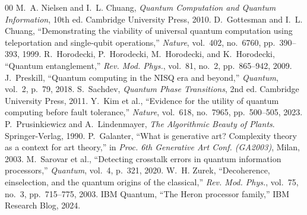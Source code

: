\documentclass[conference]{IEEEtran}
\begin{document}
\begin{thebibliography}{00}
 M.~A. Nielsen and I.~L. Chuang, \emph{Quantum Computation and Quantum Information}, 10th ed. Cambridge University Press, 2010.
 D.~Gottesman and I.~L. Chuang, ``Demonstrating the viability of universal quantum computation using teleportation and single-qubit operations,'' \emph{Nature}, vol.~402, no.~6760, pp.~390--393, 1999.
 R.~Horodecki, P.~Horodecki, M.~Horodecki, and K.~Horodecki, ``Quantum entanglement,'' \emph{Rev. Mod. Phys.}, vol.~81, no.~2, pp.~865--942, 2009.
 J.~Preskill, ``Quantum computing in the NISQ era and beyond,'' \emph{Quantum}, vol.~2, p.~79, 2018.
 S.~Sachdev, \emph{Quantum Phase Transitions}, 2nd ed. Cambridge University Press, 2011.
 Y.~Kim et al., ``Evidence for the utility of quantum computing before fault tolerance,'' \emph{Nature}, vol.~618, no.~7965, pp.~500--505, 2023.
 P.~Prusinkiewicz and A.~Lindenmayer, \emph{The Algorithmic Beauty of Plants}. Springer-Verlag, 1990.
 P.~Galanter, ``What is generative art? Complexity theory as a context for art theory,'' in \emph{Proc. 6th Generative Art Conf. (GA2003)}, Milan, 2003.
 M.~Sarovar et al., ``Detecting crosstalk errors in quantum information processors,'' \emph{Quantum}, vol.~4, p.~321, 2020.
 W.~H. Zurek, ``Decoherence, einselection, and the quantum origins of the classical,'' \emph{Rev. Mod. Phys.}, vol.~75, no.~3, pp.~715--775, 2003.
 IBM Quantum, ``The Heron processor family,'' IBM Research Blog, 2024.
\end{thebibliography}
\end{document}
